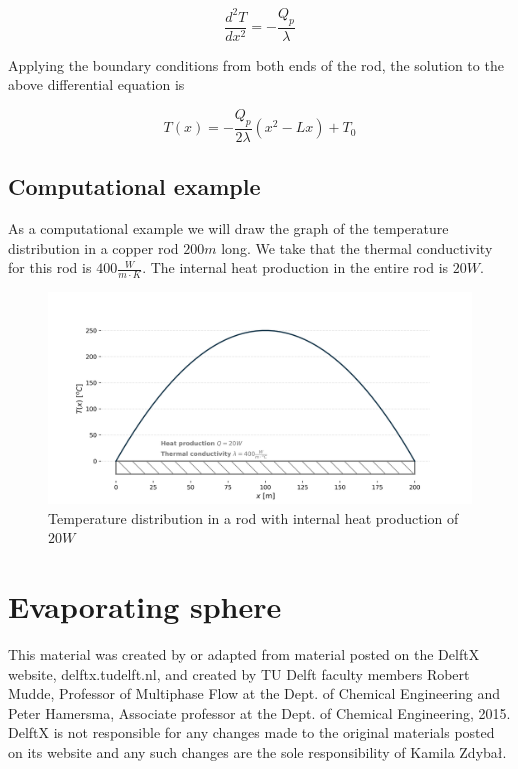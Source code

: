 \documentclass[10pt]{article}
\begin{document}
\begin{equation}
\frac{d^2T}{dx^2} = - \frac{Q_p}{\lambda}
\end{equation}

Applying the boundary conditions from both ends of the rod, the solution to the above differential equation is

\begin{equation}
T(x) = - \frac{Q_p}{2 \lambda} (x^2 - Lx) + T_0
\label{eq:solution}
\end{equation}

\newpage

\subsection*{Computational example}

As a computational example we will draw the graph of the temperature distribution in a copper rod $200 m$ long. We take that the thermal conductivity for this rod is $400 \frac{W}{m \cdot K}$. The internal heat production in the entire rod is $20 W$.

\begin{figure}[H]
\centering\includegraphics[width=18cm]{temperature_distribution.png}
\caption{Temperature distribution in a rod with internal heat production of $20 W$}
\label{fig:python_graph}
\end{figure}

\section{Evaporating sphere}








\newpage

\thispagestyle{empty}


This material was created by or adapted from material posted on the DelftX website, delftx.tudelft.nl, and created by TU Delft faculty members Robert Mudde, Professor of Multiphase Flow at the Dept. of Chemical Engineering and Peter Hamersma, Associate professor at the Dept. of Chemical Engineering, 2015. DelftX is not responsible for any changes made to the original materials posted on its website and any such changes are the sole responsibility of Kamila Zdybał.
\end{document}
